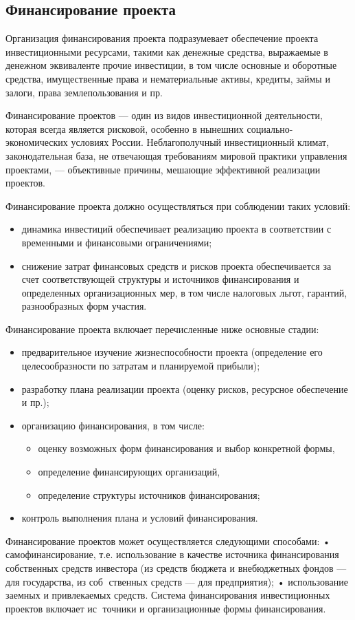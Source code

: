 \subsection{Финансирование проекта}

Организация финансирования проекта подразумевает обеспечение проекта инвестиционными ресурсами, такими как денежные средства, выражаемые в денежном эквиваленте прочие инвестиции, в том числе основные и оборотные средства, имущественные права и нематериальные активы, кредиты, займы и залоги, права землепользования и пр.

Финансирование проектов --- один из видов инвестиционной деятельности, которая всегда является рисковой, особенно в нынешних социально-экономических условиях России.
Неблагополучный инвестиционный климат, законодательная база, не отвечающая требованиям мировой практики управления проектами, --- объективные причины, мешающие эффективной реализации проектов.

Финансирование проекта должно осуществляться при соблюдении таких условий:
\begin{itemize}
	\item динамика инвестиций обеспечивает реализацию проекта в соответствии с временными и финансовыми ограничениями;
	\item снижение затрат финансовых средств и рисков проекта обеспечивается за счет соответствующей структуры и источников финансирования и определенных организационных мер, в том числе налоговых льгот, гарантий, разнообразных форм участия.
\end{itemize}

Финансирование проекта включает перечисленные ниже основные стадии:
\begin{itemize}
	\item  предварительное изучение жизнеспособности проекта (определение его целесообразности по затратам и планируемой прибыли);
	\item  разработку плана реализации проекта (оценку рисков, ресурсное обеспечение и пр.);
	\item  организацию финансирования, в том числе:
	\begin{itemize}
		\item  оценку возможных форм финансирования и выбор конкретной формы,
		\item  определение финансирующих организаций,
		\item  определение структуры источников финансирования;
	\end{itemize}
	\item  контроль выполнения плана и условий финансирования.
\end{itemize}

Финансирование проектов может осуществляется следующими
способами:
• самофинансирование, т.е. использование в качестве источника
финансирования собственных средств инвестора (из средств
бюджета и внебюджетных фондов — для государства, из соб
ственных средств — для предприятия);
• использование заемных и привлекаемых средств.
Система финансирования инвестиционных проектов включает ис
точники и организационные формы финансирования.








